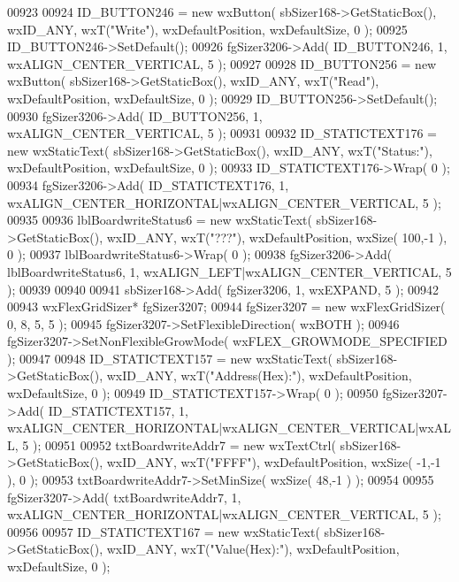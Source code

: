 \begin{DoxyCode}
00923     
00924     ID_BUTTON246 = \textcolor{keyword}{new} wxButton( sbSizer168->GetStaticBox(), wxID\_ANY, wxT(\textcolor{stringliteral}{"Write"}), wxDefaultPosition, 
      wxDefaultSize, 0 );
00925     ID_BUTTON246->SetDefault(); 
00926     fgSizer3206->Add( ID_BUTTON246, 1, wxALIGN\_CENTER\_VERTICAL, 5 );
00927     
00928     ID_BUTTON256 = \textcolor{keyword}{new} wxButton( sbSizer168->GetStaticBox(), wxID\_ANY, wxT(\textcolor{stringliteral}{"Read"}), wxDefaultPosition, 
      wxDefaultSize, 0 );
00929     ID_BUTTON256->SetDefault(); 
00930     fgSizer3206->Add( ID_BUTTON256, 1, wxALIGN\_CENTER\_VERTICAL, 5 );
00931     
00932     ID_STATICTEXT176 = \textcolor{keyword}{new} wxStaticText( sbSizer168->GetStaticBox(), wxID\_ANY, wxT(\textcolor{stringliteral}{"Status:"}), 
      wxDefaultPosition, wxDefaultSize, 0 );
00933     ID_STATICTEXT176->Wrap( 0 );
00934     fgSizer3206->Add( ID_STATICTEXT176, 1, wxALIGN\_CENTER\_HORIZONTAL|wxALIGN\_CENTER\_VERTICAL, 5 );
00935     
00936     lblBoardwriteStatus6 = \textcolor{keyword}{new} wxStaticText( sbSizer168->GetStaticBox(), wxID\_ANY, wxT(\textcolor{stringliteral}{"???"}), 
      wxDefaultPosition, wxSize( 100,-1 ), 0 );
00937     lblBoardwriteStatus6->Wrap( 0 );
00938     fgSizer3206->Add( lblBoardwriteStatus6, 1, wxALIGN\_LEFT|wxALIGN\_CENTER\_VERTICAL, 5 );
00939     
00940     
00941     sbSizer168->Add( fgSizer3206, 1, wxEXPAND, 5 );
00942     
00943     wxFlexGridSizer* fgSizer3207;
00944     fgSizer3207 = \textcolor{keyword}{new} wxFlexGridSizer( 0, 8, 5, 5 );
00945     fgSizer3207->SetFlexibleDirection( wxBOTH );
00946     fgSizer3207->SetNonFlexibleGrowMode( wxFLEX\_GROWMODE\_SPECIFIED );
00947     
00948     ID_STATICTEXT157 = \textcolor{keyword}{new} wxStaticText( sbSizer168->GetStaticBox(), wxID\_ANY, wxT(\textcolor{stringliteral}{"Address(Hex):"}), 
      wxDefaultPosition, wxDefaultSize, 0 );
00949     ID_STATICTEXT157->Wrap( 0 );
00950     fgSizer3207->Add( ID_STATICTEXT157, 1, wxALIGN\_CENTER\_HORIZONTAL|wxALIGN\_CENTER\_VERTICAL|wxALL, 5 );
00951     
00952     txtBoardwriteAddr7 = \textcolor{keyword}{new} wxTextCtrl( sbSizer168->GetStaticBox(), wxID\_ANY, wxT(\textcolor{stringliteral}{"FFFF"}), 
      wxDefaultPosition, wxSize( -1,-1 ), 0 );
00953     txtBoardwriteAddr7->SetMinSize( wxSize( 48,-1 ) );
00954     
00955     fgSizer3207->Add( txtBoardwriteAddr7, 1, wxALIGN\_CENTER\_HORIZONTAL|wxALIGN\_CENTER\_VERTICAL, 5 );
00956     
00957     ID_STATICTEXT167 = \textcolor{keyword}{new} wxStaticText( sbSizer168->GetStaticBox(), wxID\_ANY, wxT(\textcolor{stringliteral}{"Value(Hex):"}), 
      wxDefaultPosition, wxDefaultSize, 0 );

\end{DoxyCode}
